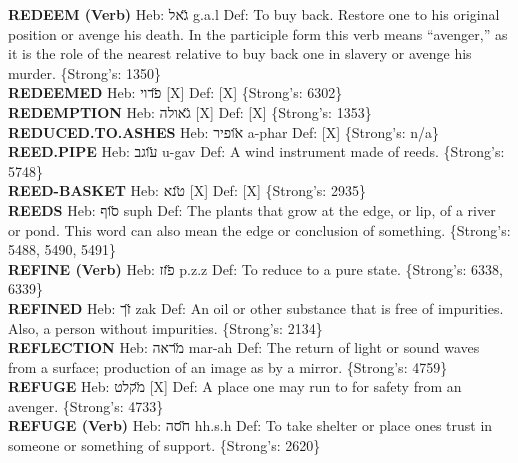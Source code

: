 {\textbf{REDEEM (Verb)} Heb: {\large\H גאל} g.a.l Def: To buy back. Restore one to his original position or avenge his death. In the participle form this verb means ``avenger,'' as it is the role of the nearest relative to buy back one in slavery or avenge his murder. \{Strong's: 1350\}\hfill{}\\

\textbf{REDEEMED} Heb: {\large\H פדוי} {[}X{]} Def: {[}X{]} \{Strong's: 6302\}\hfill{}\\

\textbf{REDEMPTION} Heb: {\large\H גאולה} {[}X{]} Def: {[}X{]} \{Strong's: 1353\}\hfill{}\\

\textbf{REDUCED.TO.ASHES} Heb: {\large\H אופיר} a-phar Def: {[}X{]} \{Strong's: n/a\}\hfill{}\\

\textbf{REED.PIPE} Heb: {\large\H עוגב} u-gav Def: A wind instrument made of reeds. \{Strong's: 5748\}\hfill{}\\

\textbf{REED-BASKET} Heb: {\large\H טנא} {[}X{]} Def: {[}X{]} \{Strong's: 2935\}\hfill{}\\

\textbf{REEDS} Heb: {\large\H סוף} suph Def: The plants that grow at the edge, or lip, of a river or pond. This word can also mean the edge or conclusion of something. \{Strong's: 5488, 5490, 5491\}\hfill{}\\

\textbf{REFINE (Verb)} Heb: {\large\H פזז} p.z.z Def: To reduce to a pure state. \{Strong's: 6338, 6339\}\hfill{}\\

\textbf{REFINED} Heb: {\large\H זך} zak Def: An oil or other substance that is free of impurities. Also, a person without impurities. \{Strong's: 2134\}\hfill{}\\

\textbf{REFLECTION} Heb: {\large\H מראה} mar-ah Def: The return of light or sound waves from a surface; production of an image as by a mirror. \{Strong's: 4759\}\hfill{}\\

\textbf{REFUGE} Heb: {\large\H מקלט} {[}X{]} Def: A place one may run to for safety from an avenger. \{Strong's: 4733\}\hfill{}\\

\textbf{REFUGE (Verb)} Heb: {\large\H חסה} hh.s.h Def: To take shelter or place ones trust in someone or something of support. \{Strong's: 2620\}\hfill{}\\

}
